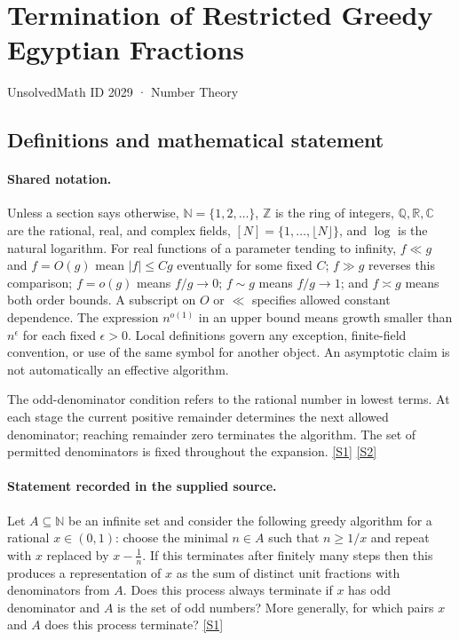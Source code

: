 \documentclass[11pt,a4paper]{article}
\newcommand{\N}{\mathbb{N}}
\newcommand{\Z}{\mathbb{Z}}
\newcommand{\Q}{\mathbb{Q}}
\newcommand{\R}{\mathbb{R}}
\newcommand{\C}{\mathbb{C}}
\newcommand{\sref}[2]{\hyperlink{source:#1:#2}{[S#2]}}
\begin{document}

\setcounter{section}{2028}

\section{Termination of Restricted Greedy Egyptian Fractions}\label{2029}

{\small\sffamily UnsolvedMath ID 2029 · Number Theory}

\subsection{Definitions and mathematical statement}

\paragraph{Shared notation.}Unless a section says otherwise, $\N=\{1,2,\ldots\}$,
$\Z$ is the ring of integers, $\Q,\R,\C$ are the rational, real, and complex
fields, $[N]=\{1,\ldots,\lfloor N\rfloor\}$, and $\log$ is the natural
logarithm. For real functions of a parameter tending to infinity,
$f\ll g$ and $f=O(g)$ mean $|f|\leq Cg$ eventually for some fixed $C$;
$f\gg g$ reverses this comparison; $f=o(g)$ means $f/g\to0$;
$f\sim g$ means $f/g\to1$; and $f\asymp g$ means both order bounds.
A subscript on $O$ or $\ll$ specifies allowed constant dependence.
The expression $n^{o(1)}$ in an upper bound means growth smaller than
$n^\epsilon$ for each fixed $\epsilon>0$. Local definitions govern any
exception, finite-field convention, or use of the same symbol for another
object. An asymptotic claim is not automatically an effective algorithm.



The odd-denominator condition refers to the rational number in lowest terms. At each stage the current positive remainder determines the next allowed denominator; reaching remainder zero terminates the algorithm. The set of permitted denominators is fixed throughout the expansion. \sref{2029}{1} \sref{2029}{2}

\paragraph{Statement recorded in the supplied source.}
Let $A\subseteq \mathbb{N}$ be an infinite set and consider the following greedy algorithm for a rational $x\in (0,1)$: choose the minimal $n\in A$ such that $n\geq 1/x$ and repeat with $x$ replaced by $x-\frac{1}{n}$. If this terminates after finitely many steps then this produces a representation of $x$ as the sum of distinct unit fractions with denominators from $A$.
Does this process always terminate if $x$ has odd denominator and $A$ is the set of odd numbers? More generally, for which pairs $x$ and $A$ does this process terminate? \sref{2029}{1}
\end{document}

